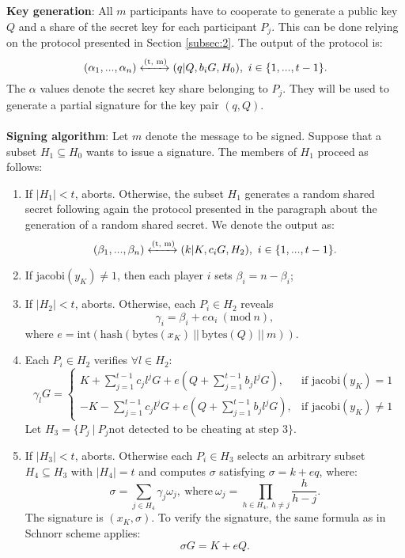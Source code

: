 \bigskip
\noindent
{\bf Key generation}: All $m$ participants have to cooperate to generate a public key $Q$ and a share of the secret key for each participant $P_j$. This can be done relying on the protocol presented in Section \ref{subsec:2}. The output of the protocol is:
$$(\alpha_1, ..., \alpha_n) \xleftrightarrow{\text{(t, m)}} (q|Q, b_iG, H_0), \ i \in \{1, ..., t - 1\}.$$
The $\alpha$ values denote the secret key share belonging to $P_j$. They will be used to generate a partial signature for the key pair $(q, Q)$.
\\
\\
{\bf Signing algorithm}: Let $m$ denote the message to be signed. Suppose that a subset $H_1 \subseteq H_0$ wants to issue a signature. The members of $H_1$ proceed as follows:
\begin{enumerate}
	\item If $|H_1| < t$, aborts. Otherwise, the subset $H_1$ generates a random shared secret following again the protocol presented in the paragraph about the generation of a random shared secret. We denote the output as:
	$$(\beta_1, ..., \beta_n) \xleftrightarrow{\text{(t, m)}} (k|K, c_iG, H_2), \ i \in \{1, ..., t - 1\}.$$
	\item If $\text{jacobi}(y_K) \neq 1$, then each player $i$ sets $\beta_i = n - \beta_i$;
	\item If $|H_2| < t$, aborts. Otherwise, each $P_i \in H_2$ reveals
	$$\gamma_i = \beta_i + e\alpha_i \ (\text{mod} \ n),$$
	where $e = \text{int}(\text{hash}(\text{bytes}(x_K) \ || \ \text{bytes}(Q) \ || \ m))$.
	\item Each $P_i \in H_2$ verifies $\forall l \in H_2$:
	$$\gamma_lG = \begin{cases} K + \sum_{j = 1}^{t - 1} c_jl^jG + e\left(Q + \sum_{j = 1}^{t - 1}b_jl^jG\right), & \mbox{if } \text{jacobi}(y_K) = 1 \\ - K -\sum_{j = 1}^{t - 1} c_jl^jG + e\left(Q + \sum_{j = 1}^{t - 1}b_jl^jG\right), & \mbox{if } \text{jacobi}(y_K) \neq 1 \end{cases}$$
	Let $H_3 = \{P_j \ | \ P_j \text{not detected to be cheating at step 3}\}$.
	\item If $|H_3| < t$, aborts. Otherwise each $P_i \in H_3$ selects an arbitrary subset $H_4 \subseteq H_3$ with $|H_4| = t$ and computes $\sigma$ satisfying $\sigma = k + eq$, where:
	$$\sigma = \sum_{j \in H_4}\gamma_j\omega_j, \ \text{where} \ \omega_j = \prod_{h \in H_4, \ h \neq j}\frac{h}{h - j}.$$
	The signature is $(x_K, \sigma)$. To verify the signature, the same formula as in Schnorr scheme applies:
	$$\sigma G = K + eQ.$$
\end{enumerate}
